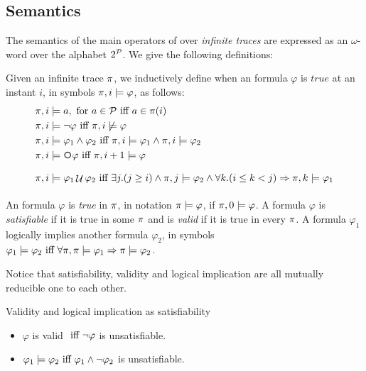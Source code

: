 \subsection{Semantics}
The semantics of the main operators of \LTL over \textit{infinite traces} are expressed as an $\omega$-word over the alphabet $2^\P$. We give the following definitions:
\begin{definition}\label{ltl-semantics}
	Given an infinite trace $\trace$, we inductively define when an \LTL formula $\varphi$ is $true$ at an instant $i$, in symbols $\trace, i \models \varphi$, as follows:
	\begin{align*}
	\trace, i &\models a, \tm{for} a\in\P \tiff a \in \trace(i)\\
	\trace, i &\models \lnot \varphi \tiff \trace, i \not\models \varphi\\
	\trace, i &\models \varphi_1 \lAND \varphi_2 \tiff \trace, i \models \varphi_1 \lAND \trace, i \models \varphi_2\\
	\trace, i &\models \Next\varphi \tiff \trace,i+1 \models \varphi\\
	\trace, i &\models \varphi_1 \lUntil \varphi_2 \tiff \exists j. (j\ge i) \lAND \trace,j \models \varphi_2 \lAND\forall k. (i\le k < j) \Rightarrow \trace, k \models \varphi_1\\
	\end{align*}
\end{definition}
\begin{definition}\label{ltl-sat-val-ent}
An \LTL formula $\varphi$ is \emph{true} in $\trace$, in notation $\trace \models \varphi$, if $\trace, 0 \models \varphi$. A formula $\varphi$ is \emph{satisfiable} if it is true in some $\trace$ and is \emph{valid} if it is true in every $\trace$. A formula $\varphi_1$ logically implies another formula $\varphi_2$, in symbols $\varphi_1 \models \varphi_2 \tiff \forall \trace, \trace \models \varphi_1 \Rightarrow \trace \models \varphi_2$.
\end{definition}
Notice that satisfiability, validity and logical implication are all mutually reducible one to each other.
\begin{example}\label{ltl-sat-examples}
Validity and logical implication as satisfiability
\begin{itemize}
\item $\varphi$ is valid $\tiff \lnot \varphi$ is unsatisfiable.
\item $\varphi_1 \models \varphi_2 \tiff \varphi_1 \lAND \lnot \varphi_2$ is unsatisfiable.
\end{itemize}
\end{example}
